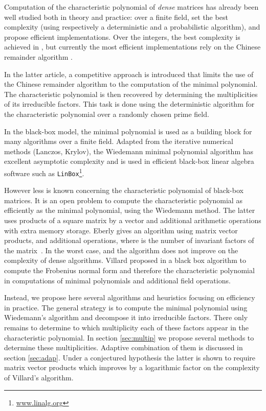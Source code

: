 \documentclass{article}
\begin{document}
Computation of the characteristic polynomial of \textit{dense} matrices has already been well
studied both in theory and practice: over a finite field,
\cite{Keller-Gehrig:1985:charpoly,Pernet:2007:charp} set the best complexity
(using respectively a deterministic and a probabilistic algorithm), and 
\cite{jgd:2005:charp,Pernet:2007:charp} propose efficient implementations.
Over the integers, the best complexity is achieved in
\cite{Kaltofen:2005:CCDet}, but currently the  most efficient implementations 
rely on the Chinese remainder algorithm \cite{jgd:2005:charp}. 

In the latter article, a competitive approach is introduced that limits the use
of the Chinese remainder algorithm to the computation of the minimal polynomial.
The characteristic polynomial is then recovered by determining
the multiplicities of its irreducible factors. This task is done using the
deterministic algorithm for the characteristic polynomial over a randomly
chosen prime field.

In the black-box model, the minimal polynomial is used as a building block for
many algorithms over a finite field. Adapted from the iterative numerical
methods (Lanczos, Krylov), the Wiedemann minimal polynomial algorithm
\cite{Wiedemann:1986:SSLE,Kaltofen:1991:SSLS} has excellent asymptotic complexity
and is used in efficient black-box linear algebra software such as 
\texttt{LinBox}\footnote{\url{www.linalg.org}}.

However less is known concerning the characteristic
polynomial of black-box matrices. It is an open problem
\cite[Open Problem 3]{Kaltofen:1998:Open} to compute 
the characteristic polynomial as efficiently as the minimal polynomial, using
the Wiedemann method. The latter uses  products of a square 
matrix by a vector and  additional arithmetic
operations with  extra memory storage.
Eberly gives an algorithm  using  matrix vector products,
and  additional operations, where  is the number of
invariant factors of the matrix~\cite{Eberly:2000:BBFDOSF}. 
In the worst case,  and the
algorithm does not improve on the complexity of dense algorithms.
Villard proposed in \cite{Villard:2000:Frob} a black box
algorithm to compute the Frobenius normal form and therefore the characteristic
polynomial in  computations of minimal polynomials 
and  additional field operations. 

Instead, we propose here several algorithms and heuristics focusing on
efficiency in practice.
The general strategy is to compute the minimal
polynomial using  Wiedemann's algorithm and decompose it into irreducible factors.
There only remains to determine to which multiplicity each of
these factors appear in the characteristic polynomial. 
In section \ref{sec:multip} we propose
several methods to determine these multiplicities.
Adaptive combination of them is discussed in 
section \ref{sec:adap}. 
Under a conjectured hypothesis the latter is shown to
require   matrix vector products which improves by a logarithmic
factor on the complexity of Villard's algorithm.
\end{document}

